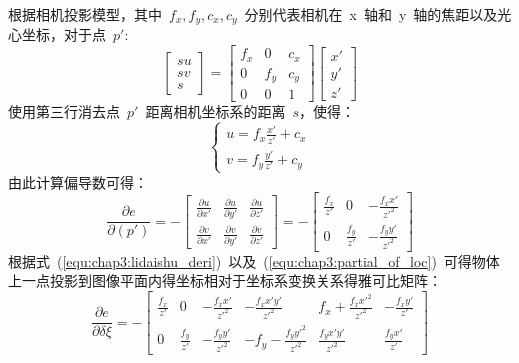 根据相机投影模型，其中~$f_x,f_y,c_x,c_y$~分别代表相机在~x~轴和~y~轴的焦距以及光心坐标，对于点~$p'$:
\begin{equation}
  \label{equ:chap3:point_proj}
\left[\begin{matrix} su  \\ sv\\ s \end{matrix}\right]=\left[ \begin{matrix} f_x & 0 & c_x \\ 0 & f_y & c_y \\ 0 & 0 & 1\end{matrix}\right]\left[ \begin{matrix} x' \\ y' \\z' \end{matrix}\right]
\end{equation}
使用第三行消去点~$p'$~距离相机坐标系的距离~$s$，使得：
\begin{equation}
  \label{equ:chap3:u_and_v}
  \left\{
    \begin{aligned}{}
      u=f_x\frac{x'}{z'}+c_x \\
      v=f_y\frac{y'}{z'}+c_y
    \end{aligned}
  \right.
\end{equation}
由此计算偏导数可得：
\begin{equation}
\label{equ:chap3:partial_of_loc}
\frac{\partial e}{\partial (p')}=-\left[ \begin{matrix}   
  \frac{\partial u}{\partial x'} & \frac{\partial u}{\partial y'} &  \frac{\partial u}{\partial z'} \\
  \frac{\partial v}{\partial x'} & \frac{\partial v}{\partial y'}  & \frac{\partial v}{\partial z'}
\end{matrix}\right]=-\left[
\begin{matrix}
  \frac{f_x}{z'} & 0 &  -\frac{f_xx'}{z'^2} \\
  0 & \frac{f_y}{z'}  & -\frac{f_yy'}{z'^2}
\end{matrix}  
\right]
\end{equation}
根据式~(\ref{equ:chap3:lidaishu_deri})~以及~(\ref{equ:chap3:partial_of_loc})~可得物体上一点投影到图像平面内得坐标相对于坐标系变换关系得雅可比矩阵：
\begin{equation}
  \label{equ:chap3:yakebi}
\frac{\partial e}{\partial \delta \xi}=-\left[ \begin{matrix}   
\frac{f_x}{z'} & 0 & -\frac{f_xx'}{z'^2} & -\frac{f_xx'y'}{z'^2} & f_x+\frac{f_xx'^2}{z'^2} & -\frac{f_xy'}{z'} \\
0 & \frac{f_y}{z'} & -\frac{f_yy'}{z'^2} & -f_y-\frac{f_yy'^2}{z'^2} & \frac{f_yx'y'}{z'^2} & \frac{f_yx'}{z'}
\end{matrix} \right]
\end{equation}

